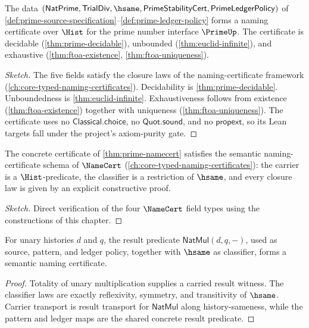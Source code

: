 \begin{theorem}
\label{thm:prime-namecert}
The data \((\mathsf{NatPrime}, \mathsf{TrialDiv}, \hsame, \mathsf{PrimeStabilityCert}, \mathsf{PrimeLedgerPolicy})\) of \autoref{def:prime-source-specification}--\autoref{def:prime-ledger-policy} forms a naming certificate over \(\Hist\) for the prime number interface \(\PrimeUp\). The certificate is decidable (\autoref{thm:prime-decidable}), unbounded (\autoref{thm:euclid-infinite}), and exhaustive (\autoref{thm:ftoa-existence}, \autoref{thm:ftoa-uniqueness}).
\end{theorem}
\begin{proof}[Sketch]
The five fields satisfy the closure laws of the naming-certificate framework (\autoref{ch:core-typed-naming-certificates}). Decidability is \autoref{thm:prime-decidable}. Unboundedness is \autoref{thm:euclid-infinite}. Exhaustiveness follows from existence (\autoref{thm:ftoa-existence}) together with uniqueness (\autoref{thm:ftoa-uniqueness}). The certificate uses no \(\mathsf{Classical.choice}\), no \(\mathsf{Quot.sound}\), and no \(\mathsf{propext}\), so its Lean targets fall under the project's axiom-purity gate.
\end{proof}

\begin{theorem}
\label{thm:prime-semantic-namecert}
The concrete certificate of \autoref{thm:prime-namecert} satisfies the semantic naming-certificate schema of \(\NameCert\) (\autoref{ch:core-typed-naming-certificates}): the carrier is a \(\Hist\)-predicate, the classifier is a restriction of \(\hsame\), and every closure law is given by an explicit constructive proof.
\end{theorem}
\begin{proof}[Sketch]
Direct verification of the four \(\NameCert\) field types using the constructions of this chapter.
\end{proof}

\begin{theorem}
\label{thm:natmul-result-semantic-namecert}
For unary histories $d$ and $q$, the result predicate
$\mathsf{NatMul}(d,q,-)$, used as source, pattern, and ledger policy, together
with $\hsame$ as classifier, forms a semantic naming certificate.
\end{theorem}
\begin{proof}
Totality of unary multiplication supplies a carried result witness. The
classifier laws are exactly reflexivity, symmetry, and transitivity of
$\hsame$. Carrier transport is result transport for $\mathsf{NatMul}$ along
history-sameness, while the pattern and ledger maps are the shared concrete
result predicate.
\end{proof}

